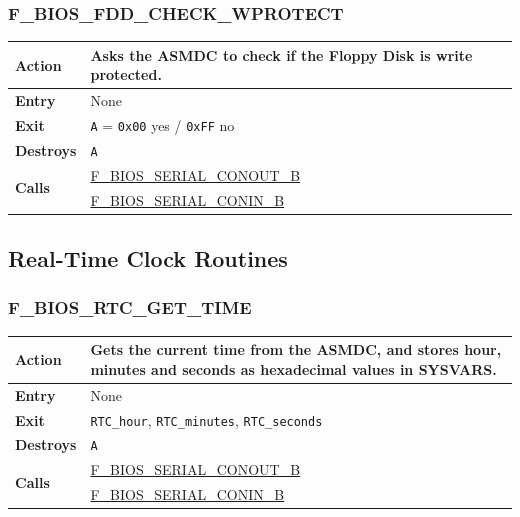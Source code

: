 \documentclass[a4paper,11pt]{article}
\begin{document}
        \subsubsection{F\_BIOS\_FDD\_CHECK\_WPROTECT}
        \label{func:fbiosfddcheckwprotect}
        \begin{tabular}{l p{9cm}}
            \hline\textbf{Action}
            & Asks the \textbf{ASMDC} to check if the Floppy Disk is write
            protected.\\
            \hline\textbf{Entry} & None \\
            \hline\textbf{Exit} & \texttt{A} = \texttt{0x00} yes / \texttt{0xFF}
            no \\
            \hline\textbf{Destroys} & \texttt{A} \\
            \hline\multirow[t]{2}{4em}{\textbf{Calls}}
            & \hyperref[func:fbiosserialconoutb]{F\_BIOS\_SERIAL\_CONOUT\_B}\\
            & \hyperref[func:fbiosserialconinb]{F\_BIOS\_SERIAL\_CONIN\_B}\\
            \hline
        \end{tabular}

    \subsection{Real-Time Clock Routines}

        \subsubsection{F\_BIOS\_RTC\_GET\_TIME}
        \label{func:fbiosrtcgettime}
        \begin{tabular}{l p{9cm}}
            \hline\textbf{Action}
            & Gets the current time from the \textbf{ASMDC}, and stores hour,
            minutes and seconds as hexadecimal values in SYSVARS. \\
            \hline\textbf{Entry} & None \\
            \hline\textbf{Exit} & \texttt{RTC\_hour}, \texttt{RTC\_minutes},
            \texttt{RTC\_seconds} \\
            \hline\textbf{Destroys} & \texttt{A} \\
            \hline\multirow[t]{2}{4em}{\textbf{Calls}}
            & \hyperref[func:fbiosserialconoutb]{F\_BIOS\_SERIAL\_CONOUT\_B}\\
            & \hyperref[func:fbiosserialconinb]{F\_BIOS\_SERIAL\_CONIN\_B}\\
            \hline
        \end{tabular}
\end{document}
